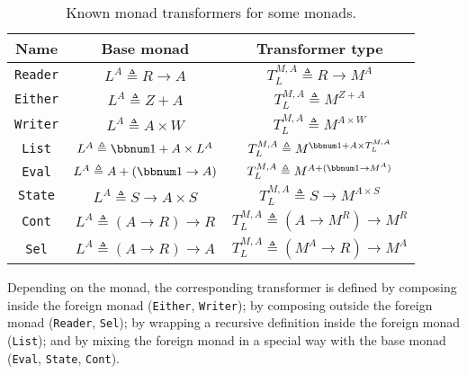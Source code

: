 \begin{wraptable}{l}{0.59\columnwidth}%
\begin{centering}
\vspace{-0.1\baselineskip}
\begin{tabular}{|c|c|c|}
\hline 
\textbf{\small{}Name} & \textbf{\small{}Base monad} & \textbf{\small{}Transformer type}\tabularnewline
\hline 
\hline 
{\small{}}\lstinline!Reader! & {\small{}$L^{A}\triangleq R\rightarrow A$} & {\small{}$T_{L}^{M,A}\triangleq R\rightarrow M^{A}$}\tabularnewline
\hline 
{\small{}}\lstinline!Either! & {\small{}$L^{A}\triangleq Z+A$} & {\small{}$T_{L}^{M,A}\triangleq M^{Z+A}$}\tabularnewline
\hline 
{\small{}}\lstinline!Writer! & {\small{}$L^{A}\triangleq A\times W$} & {\small{}$T_{L}^{M,A}\triangleq M^{A\times W}$}\tabularnewline
\hline 
{\small{}}\lstinline!List! & {\small{}$L^{A}\triangleq\bbnum 1+A\times L^{A}$} & {\small{}$T_{L}^{M,A}\triangleq M^{\bbnum 1+A\times T_{L}^{M,A}}$}\tabularnewline
\hline 
{\small{}}\lstinline!Eval! & {\small{}$L^{A}\triangleq A+\left(\bbnum 1\rightarrow A\right)$} & {\small{}$T_{L}^{M,A}\triangleq M^{A+(\bbnum 1\rightarrow M^{A})}$}\tabularnewline
\hline 
{\small{}}\lstinline!State! & {\small{}$L^{A}\triangleq S\rightarrow A\times S$} & {\small{}$T_{L}^{M,A}\triangleq S\rightarrow M^{A\times S}$}\tabularnewline
\hline 
{\small{}}\lstinline!Cont! & {\small{}$L^{A}\triangleq\left(A\rightarrow R\right)\rightarrow R$} & {\small{}$T_{L}^{M,A}\triangleq(A\rightarrow M^{R})\rightarrow M^{R}$}\tabularnewline
\hline 
{\small{}}\lstinline!Sel! & {\small{}$L^{A}\triangleq\left(A\rightarrow R\right)\rightarrow A$} & {\small{}$T_{L}^{M,A}\triangleq(M^{A}\rightarrow R)\rightarrow M^{A}$}\tabularnewline
\hline 
\end{tabular}
\par\end{centering}
\caption{\label{tab:Known-monad-transformers}Known monad transformers for
some monads.}
\vspace{-0.6\baselineskip}
\end{wraptable}%

\noindent Depending on the monad, the corresponding transformer is
defined by composing inside the foreign monad (\lstinline!Either!,
\lstinline!Writer!); by composing outside the foreign monad (\lstinline!Reader!,
\lstinline!Sel!); by wrapping a recursive definition inside the foreign
monad (\lstinline!List!); and by mixing the foreign monad in a special
way with the base monad (\lstinline!Eval!, \lstinline!State!, \lstinline!Cont!). 


